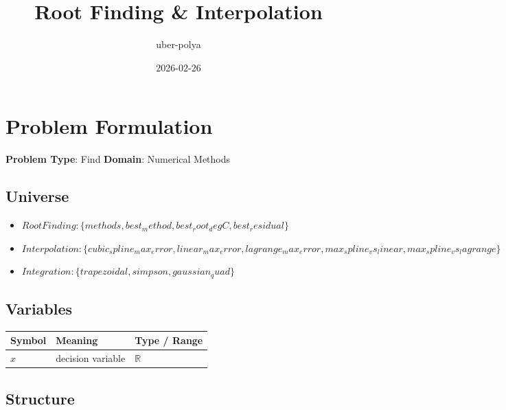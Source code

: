 \documentclass[11pt, a4paper]{article}
\title{Root Finding \& Interpolation}
\author{uber-polya}
\date{2026-02-26}
\begin{document}
\maketitle
\tableofcontents
\newpage

\section{Problem Formulation}

\begin{polyamodel}

\textbf{Problem Type}: Find \hfill
\textbf{Domain}: Numerical Methods


\end{polyamodel}

\subsection{Universe}

\begin{itemize}
  \item $Root Finding: \{methods, best_method, best_root_degC, best_residual\}$
  \item $Interpolation: \{cubic_spline_max_error, linear_max_error, lagrange_max_error, max_spline_vs_linear, max_spline_vs_lagrange\}$
  \item $Integration: \{trapezoidal, simpson, gaussian_quad\}$
\end{itemize}

\subsection{Variables}

\begin{longtable}{lll}
\toprule
\textbf{Symbol} & \textbf{Meaning} & \textbf{Type / Range} \\
\midrule
\endhead
$x$ & decision variable & $\mathbb{{R}}$ \\
\bottomrule
\end{longtable}

\subsection{Structure}
\end{document}
